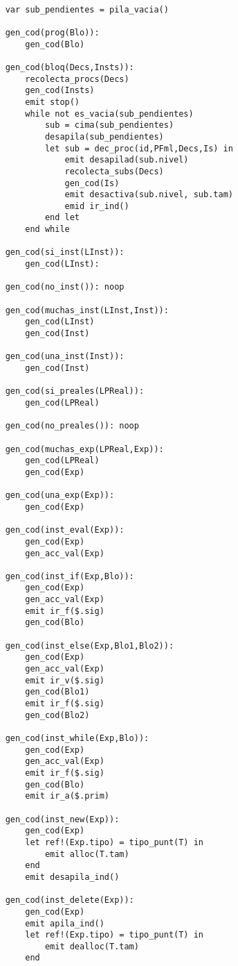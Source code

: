 
\begin{lstlisting}

    var sub_pendientes = pila_vacia()

    gen_cod(prog(Blo)):
        gen_cod(Blo)

    gen_cod(bloq(Decs,Insts)):
        recolecta_procs(Decs)
        gen_cod(Insts)
        emit stop()
        while not es_vacia(sub_pendientes)
            sub = cima(sub_pendientes)
            desapila(sub_pendientes)
            let sub = dec_proc(id,PFml,Decs,Is) in
                emit desapilad(sub.nivel)
                recolecta_subs(Decs)
                gen_cod(Is)
                emit desactiva(sub.nivel, sub.tam)
                emid ir_ind()
            end let
        end while

    gen_cod(si_inst(LInst)):
        gen_cod(LInst):

    gen_cod(no_inst()): noop

    gen_cod(muchas_inst(LInst,Inst)):
        gen_cod(LInst)
        gen_cod(Inst)

    gen_cod(una_inst(Inst)):
        gen_cod(Inst)

    gen_cod(si_preales(LPReal)):
        gen_cod(LPReal)

    gen_cod(no_preales()): noop

    gen_cod(muchas_exp(LPReal,Exp)):
        gen_cod(LPReal)
        gen_cod(Exp)

    gen_cod(una_exp(Exp)):
        gen_cod(Exp)

    gen_cod(inst_eval(Exp)):
        gen_cod(Exp)
        gen_acc_val(Exp)

    gen_cod(inst_if(Exp,Blo)):
        gen_cod(Exp)
        gen_acc_val(Exp)
        emit ir_f($.sig)
        gen_cod(Blo)

    gen_cod(inst_else(Exp,Blo1,Blo2)):
        gen_cod(Exp)
        gen_acc_val(Exp)
        emit ir_v($.sig)
        gen_cod(Blo1)
        emit ir_f($.sig)
        gen_cod(Blo2)

    gen_cod(inst_while(Exp,Blo)):
        gen_cod(Exp)
        gen_acc_val(Exp)
        emit ir_f($.sig)
        gen_cod(Blo)
        emit ir_a($.prim)

    gen_cod(inst_new(Exp)):
        gen_cod(Exp)
        let ref!(Exp.tipo) = tipo_punt(T) in
            emit alloc(T.tam)
        end
        emit desapila_ind()

    gen_cod(inst_delete(Exp)):
        gen_cod(Exp)
        emit apila_ind()
        let ref!(Exp.tipo) = tipo_punt(T) in
            emit dealloc(T.tam)
        end


\end{lstlisting}
